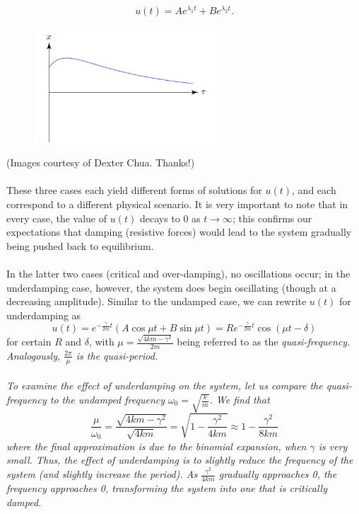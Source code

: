 \documentclass{article}
\begin{document}
\begin{enumerate}
    \begin{equation*}
        u(t) = Ae^{\lambda_1 t} + Be^{\lambda_2 t}.
    \end{equation*}
    \newpage
    \begin{figure}[h]
        \centering
        \includegraphics[width=7cm]{DE-ch3-overdamping.png}
    \end{figure} 
\end{enumerate}
(Images courtesy of Dexter Chua. Thanks!) \\ \\
These three cases each yield different forms of solutions for $u(t)$, and each correspond to a different physical scenario. It is very important to note that in every case, the value of $u(t)$ decays to 0 as $t \to \infty$; this confirms our expectations that damping (resistive forces) would lead to the system gradually being pushed back to equilibrium. \\ \\
In the latter two cases (critical and over-damping), no oscillations occur; in the underdamping case, however, the system does begin oscillating (though at a decreasing amplitude). Similar to the undamped case, we can rewrite $u(t)$ for underdamping as 
\begin{equation*}
    u(t)=e^{-\frac{\gamma}{2m}t}(A\cos\mu t + B\sin\mu t) = Re^{-\frac{\gamma}{2m}t}\cos(\mu t - \delta)
\end{equation*}
for certain $R$ and $\delta$, with $\mu = \frac{\sqrt{4km-\gamma^2}}{2m}$ being referred to as the \it quasi-frequency\normalfont. Analogously, $\frac{2\pi}{\mu}$ is the \it quasi-period.\normalfont \\ \\
To examine the effect of underdamping on the system, let us compare the quasi-frequency to the undamped frequency $\omega_0 = \sqrt{\frac{k}{m}}$. We find that 
\begin{equation*}
    \frac{\mu}{\omega_0} = \frac{\sqrt{4km-\gamma^2}}{\sqrt{4km}} = \sqrt{1-\frac{\gamma^2}{4km}} \approx 1-\frac{\gamma^2}{8km}
\end{equation*}
where the final approximation is due to the binomial expansion, when $\gamma$ is very small. Thus, the effect of underdamping is to slightly reduce the frequency of the system (and slightly increase the period). As $\frac{\gamma^2}{4km}$ gradually approaches 0, the frequency approaches 0, transforming the system into one that is critically damped.\\ \\
\end{document}
